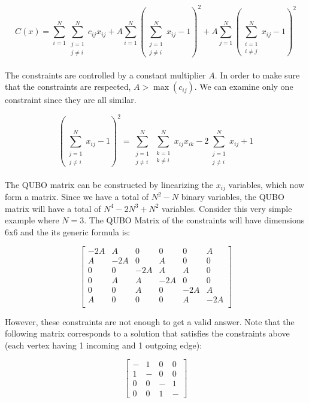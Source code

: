 \documentclass[12pt,a4paper]{report}
\begin{document}
\[
C(x) = \sum_{i=1}^{N} \sum_{\substack{j=1 \\ j \neq i}}^{N} c_{ij}x_{ij} + A \sum_{i=1}^{N} \left( \sum_{\substack{j=1 \\ j \neq i}}^{N} x_{ij} - 1 \right)^2 + A \sum_{j=1}^{N} \left( \sum_{\substack{i=1 \\ i \neq j}}^{N} x_{ij} - 1 \right)^2
\]
\\

\noindent
The constraints are controlled by a constant multiplier \( A \). In order to make sure that the constraints are respected, \( A > \max(c_{ij}) \). We can examine only one constraint since they are all similar.

\[
\left( \sum_{\substack{j=1 \\ j \neq i}}^{N} x_{ij} - 1 \right)^2 = \sum_{\substack{j=1 \\ j \neq i}}^{N} \sum_{\substack{k=1 \\ k \neq i}}^{N} x_{ij}x_{ik} - 2\sum_{\substack{j=1 \\ j \neq i}}^{N} x_{ij} + 1
\]
\\

\noindent
The QUBO matrix can be constructed by linearizing the \(x_{ij}\) variables, which now form a matrix. Since we have a total of \(N^2 - N\) binary variables, the QUBO matrix will have a total of \(N^4 - 2N^3 + N^2\) variables. Consider this very simple example where \(N=3\). The QUBO Matrix of the constraints will have dimensions 6x6 and the its generic formula is:

\[
\begin{bmatrix}
-2A & A & 0 & 0 & 0 & A \\
A & -2A & 0 & A & 0 & 0 \\
0 & 0 & -2A & A & A & 0 \\
0 & A & A & -2A & 0 & 0 \\
0 & 0 & A & 0 & -2A & A \\
A & 0 & 0 & 0 & A & -2A \\
\end{bmatrix}
\]

\noindent
However, these constraints are not enough to get a valid answer. Note that the following matrix corresponds to a solution that satisfies the constraints above (each vertex having 1 incoming and 1 outgoing edge):

\[
\begin{bmatrix}
- & 1 & 0 & 0 \\
1 & - & 0 & 0 \\
0 & 0 & - & 1 \\
0 & 0 & 1 & -
\end{bmatrix}
\]
\end{document}
